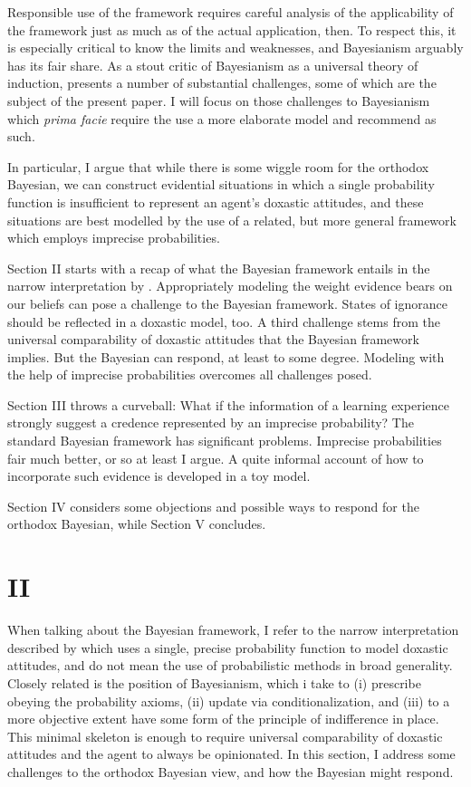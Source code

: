 \documentclass[11pt, a4paper]{scrartcl}
\begin{document}
Responsible use of the framework requires careful analysis of the applicability of the framework just as much as of the actual application, then. To respect this, it is especially critical to know the limits and weaknesses, and Bayesianism arguably has its fair share. As a stout critic of Bayesianism as a universal theory of induction, \citet{Norton2011-NORCTB} presents a number of substantial challenges, some of which are the subject of the present paper. I will focus on those challenges to Bayesianism which \emph{prima facie} require the use a more elaborate model and recommend as such.

In particular, I argue that while there is some wiggle room for the orthodox Bayesian, we can construct evidential situations in which a single probability function is insufficient to represent an agent's doxastic attitudes, and these situations are best modelled by the use of a related, but more general framework which employs imprecise probabilities.

Section II starts with a recap of what the Bayesian framework entails in the narrow interpretation by \citep{Norton2011-NORCTB}. Appropriately modeling the weight evidence bears on our beliefs can pose a challenge to the Bayesian framework. States of ignorance should be reflected in a doxastic model, too. A third challenge stems from the universal comparability of doxastic attitudes that the Bayesian framework implies. But the Bayesian can respond, at least to some degree. Modeling with the help of imprecise probabilities overcomes all challenges posed.

Section III throws a curveball: What if the information of a learning experience strongly suggest a credence represented by an imprecise probability? The standard Bayesian framework has significant problems. Imprecise probabilities fair much better, or so at least I argue. A quite informal account of how to incorporate such evidence is developed in a toy model.

Section IV considers some objections and possible ways to respond for the orthodox Bayesian, while Section V concludes.

\section{II}

When talking about the Bayesian framework, I refer to the narrow interpretation described by \citet{Norton2011-NORCTB} which uses a single, precise probability function to model doxastic attitudes, and do not mean the use of probabilistic methods in broad generality. Closely related is the position of Bayesianism, which i take to (i) prescribe obeying the probability axioms, (ii) update via conditionalization, and (iii) to a more objective extent have some form of the principle of indifference in place. This minimal skeleton is enough to require universal comparability of doxastic attitudes and the agent to always be opinionated. In this section, I address some challenges to the orthodox Bayesian view, and how the Bayesian might respond. 
\end{document}

